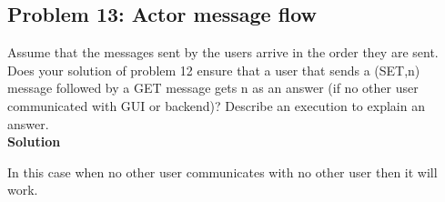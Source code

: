 \subsection{Problem 13: Actor message flow}

Assume that the messages sent by the users arrive in the order they
are sent. Does your solution of problem 12 ensure that a user that sends a (SET,n) message followed by
a GET message gets n as an answer (if no other user communicated with GUI or backend)?
Describe an execution to explain an answer. \\

\textbf{Solution}

In this case when no other user communicates with no other user then it will work. 


